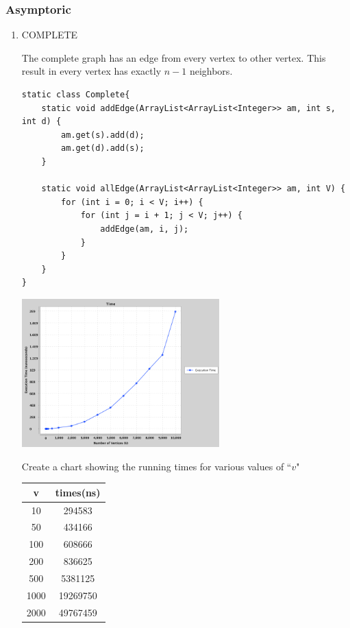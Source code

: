 \documentclass{article}
\begin{document}
\subsubsection{Asymptoric }
\begin{enumerate}
    \item COMPLETE
    
    The complete graph has an edge from every vertex to other vertex. This result in every vertex has exactly $n-1$ neighbors.\cite{Adjacency}
    \begin{verbatim}
static class Complete{
    static void addEdge(ArrayList<ArrayList<Integer>> am, int s, int d) {
        am.get(s).add(d);
        am.get(d).add(s);
    }

    static void allEdge(ArrayList<ArrayList<Integer>> am, int V) {
        for (int i = 0; i < V; i++) {
            for (int j = i + 1; j < V; j++) {
                addEdge(am, i, j);
            }
        }
    }
}
    \end{verbatim}
        \begin{center}
        \includegraphics[width=0.6\textwidth]{Completetime.png}
        \end{center}
        Create a chart showing the running times for various values of ``$v$"
    \begin{center}
    \begin{tabular}{c|c}
    \hline
    v & times(ns)  \\
    \hline
    10 & 294583\\
    \hline
    50 & 434166\\
    \hline
    100 & 608666 \\ 
    \hline
    200 & 836625 \\ 
    \hline 
    500 & 5381125\\
    \hline
    1000 & 19269750 \\
    \hline
    2000 & 49767459 \\

\end{tabular}
\end{center}
\end{enumerate}
\end{document}
